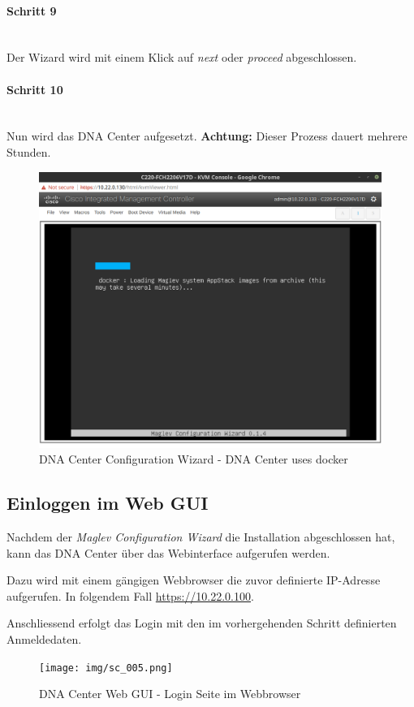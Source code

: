 \paragraph{Schritt 9}
~\\
Der Wizard wird mit einem Klick auf \textit{next} oder \textit{proceed} abgeschlossen.

\paragraph{Schritt 10}
~\\
Nun wird das DNA Center aufgesetzt. \textbf{Achtung:} Dieser Prozess dauert mehrere Stunden. 

\begin{figure}[H]
	\centering
	\includegraphics[height=9cm]{img/sc_004.png}
	\caption{DNA Center Configuration Wizard - DNA Center uses docker}
	\label{fig:dna-center-install-step-install}
\end{figure}

\subsection{Einloggen im Web GUI}
Nachdem der \textit{Maglev Configuration Wizard} die Installation abgeschlossen hat, kann das DNA Center über das Webinterface aufgerufen werden.

Dazu wird mit einem gängigen Webbrowser die zuvor definierte IP-Adresse aufgerufen. In folgendem Fall \url{https://10.22.0.100}.

Anschliessend erfolgt das Login mit den im vorhergehenden Schritt definierten Anmeldedaten. 

\begin{figure}[H]
	\centering
	\texttt{[image: img/sc\_005.png]}
	\caption{DNA Center Web GUI - Login Seite im Webbrowser}
	\label{fig:installguide-dna-center-gui-1}
\end{figure}

